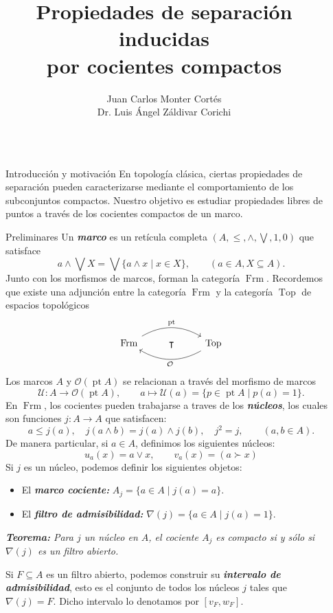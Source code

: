 \documentclass[final]{beamer}
\title{Propiedades de separación inducidas\\por cocientes compactos}
\author{Juan Carlos Monter Cortés\\ Dr. Luis Ángel Záldivar Corichi}
\institute{Universidad de Guadalajara}
\newlength{\sepwidth}
\newlength{\colwidth}
\newcommand{\separatorcolumn}{\begin{column}{\sepwidth}\end{column}}
\DeclareMathOperator{\Frm}{Frm}
\DeclareMathOperator{\pt}{pt}
\DeclareMathOperator{\Top}{Top}
\begin{document}
\begin{frame}[fragile,t]
\begin{columns}[t]
\separatorcolumn
\begin{column}{\colwidth}

\begin{block}{Introducción y motivación}
En topología clásica, ciertas propiedades de separación pueden caracterizarse mediante el comportamiento de los subconjuntos compactos. 
Nuestro objetivo es estudiar propiedades libres de puntos a través de los cocientes compactos de un marco.
\end{block}

\begin{block}{Preliminares}
Un \emph{\textbf{marco}} es un retícula completa $(A,\leq, \wedge, \bigvee, 1, 0)$ que satisface
\[
 a\wedge\bigvee X=\bigvee\{a\wedge x\mid x\in X\}, \qquad (a\in A, X\subseteq A).
\]
Junto con los morfismos de marcos, forman la categoría $\Frm$.
Recordemos que existe una adjunción entre la categoría $\Frm$ y la categoría $\Top$ de espacios topológicos
\[
\begin{tikzcd}
\Frm \arrow[rr, "\pt", bend left] & \intercal & \Top \arrow[ll, "\mathcal{O}", bend left]
\end{tikzcd}
\]
Los marcos $A$ y $\mathcal{O}(\pt A)$ se relacionan a través del morfismo de marcos
\[
\mathcal{U}\colon A\to \mathcal{O}(\pt A),\qquad a\mapsto \mathcal{U}(a)=\{p\in \pt A\mid p(a)=1\}.
\]
En $\Frm$, los cocientes pueden trabajarse a traves de los \emph{\textbf{núcleos}}, 
los cuales son funciones $j\colon A\to A$ que satisfacen:
\[
a\leq j(a),\quad j(a\wedge b)=j(a)\wedge j(b),\quad j^2=j, \qquad (a, b\in A).
\]
De manera particular, si $a\in A$, definimos los siguientes núcleos:
\[
u_a(x)=a\vee x,\qquad v_a(x)=(a\succ x)
\]
Si $j$ es un núcleo, podemos definir los siguientes objetos:
\begin{itemize}
    \item El \emph{\textbf{marco cociente:}} $A_j=\{a\in A\mid j(a)=a\}$.
    \item El \emph{\textbf{filtro de admisibilidad:}} $\nabla(j)=\{a\in A\mid j(a)=1\}$.
\end{itemize}
\textit{\textbf{Teorema:} Para $j$ un núcleo en $A$, el cociente $A_j$ es compacto si y sólo si $\nabla(j)$ es un filtro abierto.}

Si $F\subseteq A$ es un filtro abierto, podemos construir su \emph{\textbf{intervalo de admisibilidad}}, esto es el conjunto de todos 
los núcleos $j$ tales que $\nabla(j)=F$. Dicho intervalo lo denotamos por 
\(
[v_F, w_F].
\)


\end{block}
\end{column}
\end{columns}
\end{frame}
\end{document}
